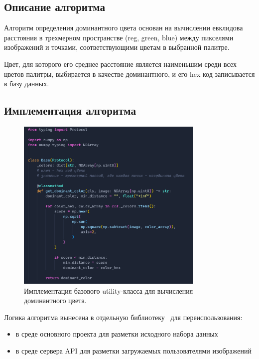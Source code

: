 \documentclass[a4paper,12pt]{extarticle}
\begin{document}
\newpage
\subsection{Описание алгоритма}

Алгоритм определения доминантного цвета основан на вычислении евклидова расстояния в трехмерном
пространстве (reg, green, blue) между пикселями изображений и точками, соответствующими цветам в
выбранной палитре.

Цвет, для которого его среднее расстояние является наименьшим среди всех цветов палитры, выбирается
в качестве доминантного, и его hex код записывается в базу данных.

\subsection{Имплементация алгоритма}

\begin{figure}[ht]
	\centering
	\includegraphics[width=0.8\textwidth]{color_utils.png}
	\caption{Имплементация базового utility-класса для вычисления доминантного цвета.}
	\label{fig:color_utils}
\end{figure}

Логика алгоритма вынесена в отдельную библиотеку~\cite{color_utils} для переиспользования:

\begin{itemize}
	\item в среде основного проекта для разметки исходного набора данных
	\item в среде сервера API для разметки загружаемых пользователями изображений
\end{itemize}
\end{document}
